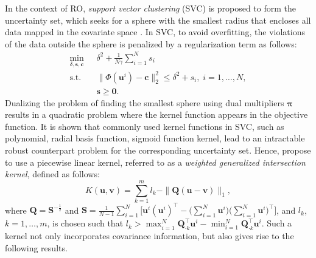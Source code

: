 \documentclass[final,onefignum,onetabnum]{class}
\newcommand{\bs}[1]{\boldsymbol{#1}} %
\newcommand{\st}{\text{s.t.}}
\begin{document}
In the context of RO, {\it support vector clustering} (SVC) is proposed to form the uncertainty set, which seeks for a sphere with the smallest radius that encloses all data mapped in the covariate space \cite{shang2017}. In SVC,  to avoid overfitting,  the violations of the data outside the sphere is penalized by a regularization term as follows:
\begin{align*}
    \min_{\delta, \bs{s}, \bs{c}} \ & \delta^{2} + \frac{1}{N\gamma} \sum_{i=1}^{N}  s_{i} \\
    \st \quad & \|\Phi(\bs{u}^{i})-\bs{c}\|_{2}^{2} \le  \delta^{2} +s_{i}, \; i=1, \ldots, N,\\
    & \bs{s}\ge \bs{0}. 
\end{align*}
Dualizing  the problem of finding the smallest sphere  using dual multipliers $\bs{\pi}$ results in a  quadratic problem where the kernel function appears in the objective function. It is shown that commonly used kernel functions in SVC, such as  polynomial, radial basis function, sigmoid function kernel, lead to an intractable robust counterpart problem for the corresponding uncertainty set. Hence, \citet{shang2017} propose to use a piecewise linear kernel, referred to as a {\it  weighted generalized intersection kernel}, defined as follows: 
\begin{equation}
    \label{eq: rev.kernel}
    K(\bs{u},\bs{v})=\sum_{k=1}^{m} l_{k} - \|\bs{Q}(\bs{u}-\bs{v})\|_{1},
\end{equation}
where $\bs{Q}=\bs{S}^{-\frac{1}{2}}$ and $\bs{S}=\frac{1}{N-1} \sum_{i=1}^{N} \Big[ \bs{u}^{i} (\bs{u}^{i})^{\top} - \big(\sum_{i=1}^{N}\bs{u}^{i}\big) \big(\sum_{i=1}^{N}\bs{u}^{i}\big) ^{\top} \Big]$, and $l_{k}$, $k=1, \ldots, m$, is chosen such that $l_{k} > \max_{i=1}^{N} \bs{Q}_{\cdot k}^{\top}\bs{u}^{i} -\min_{i=1}^{N} \bs{Q}_{\cdot k}^{\top}\bs{u}^{i}$.  
Such a kernel not only incorporates covariance information, but also gives rise to the following  results. %
\end{document}
